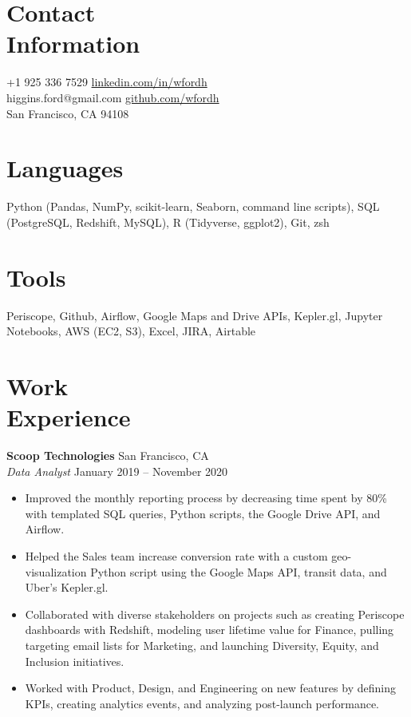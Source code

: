 \documentclass[line, margin]{res}
\begin{document}

\begin{resume}
	
	
\section{Contact \\ Information}
	+1 925 336 7529       \hfill \href{https://linkedin.com/in/wfordh/}{linkedin.com/in/wfordh} \\
	\noindent higgins.ford@gmail.com  \hfill \href{https://github.com/wfordh}{github.com/wfordh} \\
	\noindent San Francisco, CA 94108
	

\section{Languages}
	Python (Pandas, NumPy, scikit-learn, Seaborn, command line scripts), SQL (PostgreSQL, Redshift, MySQL), R (Tidyverse, ggplot2), Git, zsh
	
\section{Tools}
	Periscope, Github, Airflow, Google Maps and Drive APIs, Kepler.gl, Jupyter Notebooks, AWS (EC2, S3), Excel, JIRA, Airtable


\section{Work\\Experience}
	\textbf{Scoop Technologies} \hfill{San Francisco, CA} \vspace{1 mm}\\\vspace{0.5mm}%
	\textsl{Data Analyst} \hfill{January 2019 -- November 2020}\
	\begin{itemize}
		\item Improved the monthly reporting process by decreasing time spent by 80\% with templated SQL queries, Python scripts, the Google Drive API, and Airflow.
		\item Helped the Sales team increase conversion rate with a custom geo-visualization Python script using the Google Maps API, transit data, and Uber's Kepler.gl.
		\item Collaborated with diverse stakeholders on projects such as creating Periscope dashboards with Redshift, modeling user lifetime value for Finance, pulling targeting email lists for Marketing, and launching Diversity, Equity, and Inclusion initiatives.
		\item Worked with Product, Design, and Engineering on new features by defining KPIs, creating analytics events, and analyzing post-launch performance.
	\end{itemize}\
	

\end{resume}
\end{document}

